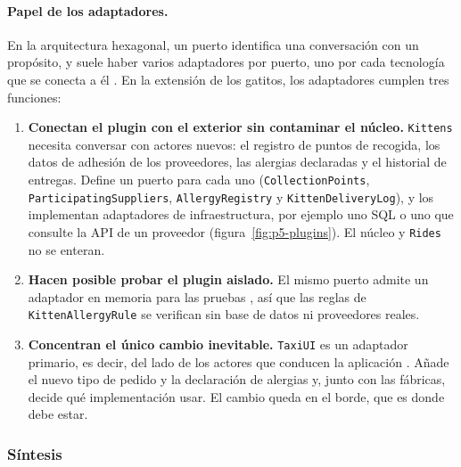 \paragraph{Papel de los adaptadores.} En la arquitectura hexagonal, un puerto identifica una
conversación con un propósito, y suele haber varios adaptadores por puerto, uno por cada tecnología
que se conecta a él \parencite[sec.~«Nature of the Solution»]{cockburn2005hexagonal}. En la extensión
de los gatitos, los adaptadores cumplen tres funciones:
\begin{enumerate}
  \item \textbf{Conectan el plugin con el exterior sin contaminar el núcleo.} \texttt{Kittens}
    necesita conversar con actores nuevos: el registro de puntos de recogida, los datos de adhesión
    de los proveedores, las alergias declaradas y el historial de entregas. Define un puerto para
    cada uno (\texttt{CollectionPoints}, \texttt{ParticipatingSuppliers}, \texttt{AllergyRegistry} y
    \texttt{KittenDeliveryLog}), y los implementan adaptadores de infraestructura, por ejemplo uno
    SQL o uno que consulte la API de un proveedor (figura~\ref{fig:p5-plugins}). El núcleo y
    \texttt{Rides} no se enteran.
  \item \textbf{Hacen posible probar el plugin aislado.} El mismo puerto admite un adaptador en
    memoria para las pruebas \parencite[sec.~«Nature of the Solution»]{cockburn2005hexagonal}, así
    que las reglas de \texttt{KittenAllergyRule} se verifican sin base de datos ni proveedores reales.
  \item \textbf{Concentran el único cambio inevitable.} \texttt{TaxiUI} es un adaptador primario,
    es decir, del lado de los actores que conducen la aplicación
    \parencite[sec.~«The Left-Right Asymmetry»]{cockburn2005hexagonal}. Añade el nuevo tipo de
    pedido y la declaración de alergias y, junto con las fábricas, decide qué implementación usar.
    El cambio queda en el borde, que es donde debe estar.
\end{enumerate}

\subsubsection{Síntesis}

